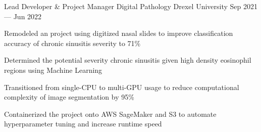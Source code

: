 
\begin{cventries}
  \cventry
    {Lead Developer \& Project Manager} %
    {Digital Pathology} %
    {Drexel University} %
    {Sep 2021 --- Jun 2022} %
    {
      \begin{cvitems} %
        \item{Remodeled an project using digitized nasal slides to improve classification accuracy of chronic sinusitis severity to 71\%}
        \item{Determined the potential severity chronic sinusitis given high density eosinophil regions using Machine Learning}
        \item{Transitioned from single-CPU to multi-GPU usage to reduce computational complexity of image segmentation by 95\%}
        \item{Containerized the project onto AWS SageMaker and S3 to automate hyperparameter tuning and increase runtime speed}
      \end{cvitems}
    }
    
    
\end{cventries}